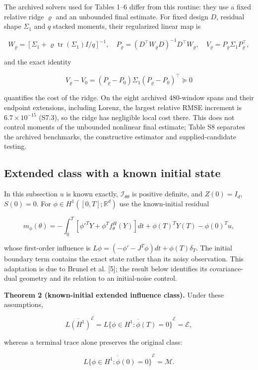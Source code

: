 \documentclass[ejs]{imsart}
\begin{document}
The archived solvers used for Tables 1--6 differ from this routine: they
use a fixed relative ridge \(\varrho\) and an unbounded final estimate.
For fixed design \(D\), residual shape \(\Sigma_1\) and \(q\) stacked
moments, their regularized linear map is

\[
W_\varrho=[\Sigma_1+\varrho\operatorname{tr}(\Sigma_1)I/q]^{-1},\quad
P_\varrho=(D^\top W_\varrho D)^{-1}D^\top W_\varrho,\quad
V_\varrho=P_\varrho\Sigma_1P_\varrho^\top,
\]

and the exact identity

\[
V_\varrho-V_0=(P_\varrho-P_0)\Sigma_1(P_\varrho-P_0)^\top\succeq0
\]

quantifies the cost of the ridge. On the eight archived 480-window spans
and their endpoint extensions, including Lorenz, the largest relative
RMSE increment is \(6.7\times10^{-15}\) (S7.3), so the ridge has
negligible local cost there. This does not control moments of the
unbounded nonlinear final estimate; Table S8 separates the archived
benchmarks, the constructive estimator and supplied-candidate testing.

\subsection{Extended class with a known initial
state}\label{extended-class-with-a-known-initial-state}

In this subsection \(u\) is known exactly, \(\mathcal I_{\theta\theta}\)
is positive definite, and \(Z(0)=I_d\), \(S(0)=0\). For
\(\phi\in H^1([0,T];\mathbb R^d)\) use the known-initial residual

\[
m_\phi(\theta)=-\int_0^T[\phi'^TY+\phi^Tf_\theta^H(Y)]dt
+\phi(T)^TY(T)-\phi(0)^Tu,
\]

whose first-order influence is
\(L\phi=(-\phi'-J^T\phi)dt+\phi(T)\delta_T\). The initial boundary term
contains the exact state rather than its noisy observation. This
adaptation is due to Brunel et al. {[}5{]}; the result below identifies
its covariance-dual geometry and its relation to an initial-noise
control.

\textbf{Theorem 2 (known-initial extended influence class).} Under these
assumptions,

\[
\overline{L(H^1)}^{\mathcal E}
=\overline{L\{\phi\in H^1:\phi(T)=0\}}^{\mathcal E}
=\mathcal E,
\]

whereas a terminal trace alone preserves the original class:

\[
\overline{L\{\phi\in H^1:\phi(0)=0\}}^{\mathcal E}=\mathcal M.
\]
\end{document}
